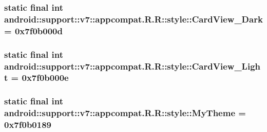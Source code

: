 \hypertarget{classandroid_1_1support_1_1v7_1_1appcompat_1_1_r_1_1style_22290d35891763becc47e72445b88192}{
\subsubsection[{CardView\_\-Dark}]{\setlength{\rightskip}{0pt plus 5cm}static final int android::support::v7::appcompat.R.R::style::CardView\_\-Dark = 0x7f0b000d}}
\label{classandroid_1_1support_1_1v7_1_1appcompat_1_1_r_1_1style_22290d35891763becc47e72445b88192}


\hypertarget{classandroid_1_1support_1_1v7_1_1appcompat_1_1_r_1_1style_e2edfb28aeeea5788279ce24cdf0197e}{
\subsubsection[{CardView\_\-Light}]{\setlength{\rightskip}{0pt plus 5cm}static final int android::support::v7::appcompat.R.R::style::CardView\_\-Light = 0x7f0b000e}}
\label{classandroid_1_1support_1_1v7_1_1appcompat_1_1_r_1_1style_e2edfb28aeeea5788279ce24cdf0197e}


\hypertarget{classandroid_1_1support_1_1v7_1_1appcompat_1_1_r_1_1style_3e9ac9d0274c7652e8cb9244e07222d6}{
\subsubsection[{MyTheme}]{\setlength{\rightskip}{0pt plus 5cm}static final int android::support::v7::appcompat.R.R::style::MyTheme = 0x7f0b0189}}
\label{classandroid_1_1support_1_1v7_1_1appcompat_1_1_r_1_1style_3e9ac9d0274c7652e8cb9244e07222d6}



